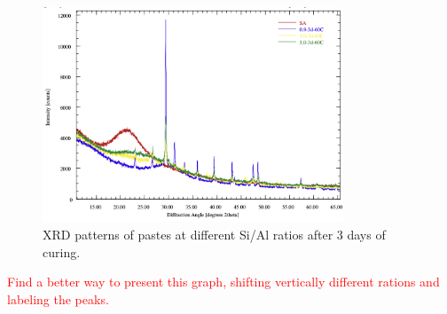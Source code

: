 \begin{figure}[H]
    \centering
    \includegraphics[width=0.8\textwidth]{Cap4/images/xrd_pastes.png}
    \caption{XRD patterns of pastes at different Si/Al ratios after 3 days of curing.}
    \label{fig:xrd_pastes}
\end{figure}

\textcolor{red}{Find a better way to present this graph, shifting vertically different rations and labeling the peaks.}